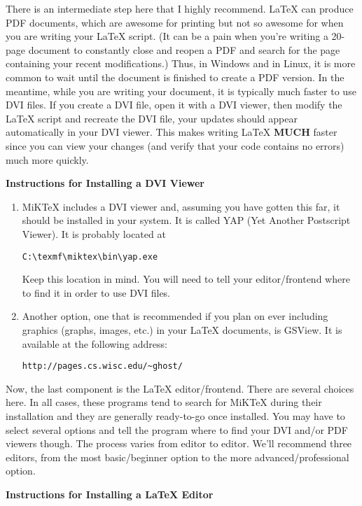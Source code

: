 \documentclass{article}
\begin{document}
There is an intermediate step here that I highly recommend. LaTeX can produce PDF documents, which are awesome for printing but not so awesome for when you are writing your LaTeX script. (It can be a pain when you're writing a 20-page document to constantly close and reopen a PDF and search for the page containing your recent modifications.) Thus, in Windows and in Linux, it is more common to wait until the document is finished to create a PDF version. In the meantime, while you are writing your document, it is typically much faster to use DVI files. If you create a DVI file, open it with a DVI viewer, then modify the LaTeX script and recreate the DVI file, your updates should appear automatically in your DVI viewer. This makes writing LaTeX \textbf{MUCH} faster since you can view your changes (and verify that your code contains no errors) much more quickly.

\bigbreak\textbf{Instructions for Installing a DVI Viewer}

\begin{enumerate}
 \item MiKTeX includes a DVI viewer and, assuming you have gotten this far, it should be installed in your system. It is called YAP (Yet Another Postscript Viewer). It is probably located at \begin{verbatim}C:\texmf\miktex\bin\yap.exe\end{verbatim}
Keep this location in mind. You will need to tell your editor/frontend where to find it in order to use DVI files.
\item Another option, one that is recommended if you plan on ever including graphics (graphs, images, etc.) in your LaTeX documents, is GSView. It is available at the following address:
\begin{verbatim}http://pages.cs.wisc.edu/~ghost/\end{verbatim}
\end{enumerate}

Now, the last component is the LaTeX editor/frontend. There are several choices here. In all cases, these programs tend to search for MiKTeX during their installation and they are generally ready-to-go once installed. You may have to select several options and tell the program where to find your DVI and/or PDF viewers though. The process varies from editor to editor. We'll recommend three editors, from the most basic/beginner option to the more advanced/professional option.

\bigbreak\textbf{Instructions for Installing a LaTeX Editor}
\end{document}
